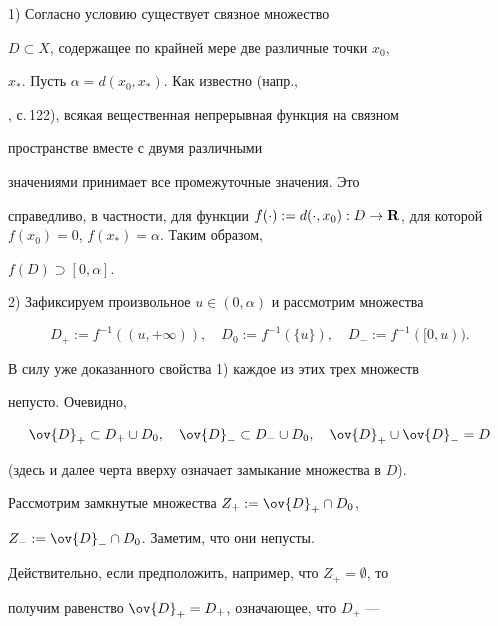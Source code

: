 \begin{pf} 1) Согласно условию существует связное множество


$D\subset X$, содержащее по крайней мере две различные точки $x_0$,


$x_\ast$. Пусть $\alpha=d(x_0,x_\ast)$. Как известно (напр.,


\cite{31}, с.\,122), всякая вещественная непрерывная функция на связном


пространстве вместе с двумя различными


значениями принимает все промежуточные значения. Это


справедливо, в частности, для функции $f(\cdot):= d(\cdot,x_0):D\to{\spc


R}$, для которой $f(x_0)=0$, $f(x_\ast)=\alpha$. Таким образом,


$f(D)\supset[0,\alpha]$.





2) Зафиксируем произвольное $u\in(0,\alpha)$ и рассмотрим множества


$$


D_+:= f^{-1}((u,+\infty)), \quad D_0:= f^{-1}(\{u\}), \quad


D_-:= f^{-1}([0,u)).


$$


В силу уже доказанного свойства 1) каждое из этих трех множеств


непусто. Очевидно,


\begin{equation}


\label{9}


\ov{D}_+\subset D_+\cup D_0, \quad


\ov{D}_-\subset D_-\cup D_0, \quad


\ov{D}_+\cup\ov{D}_-=D


\end{equation}


(здесь и далее черта вверху означает замыкание множества в $D$).





Рассмотрим замкнутые множества $Z_+:=\ov{D}_+\cap D_0$,


$Z_-:=\ov{D}_-\cap D_0$. Заметим, что они непусты.


Действительно, если предположить, например, что $Z_+=\emptyset$, то


получим равенство $\ov{D}_+=D_+$, означающее, что $D_+$ ---



\end{pf}
